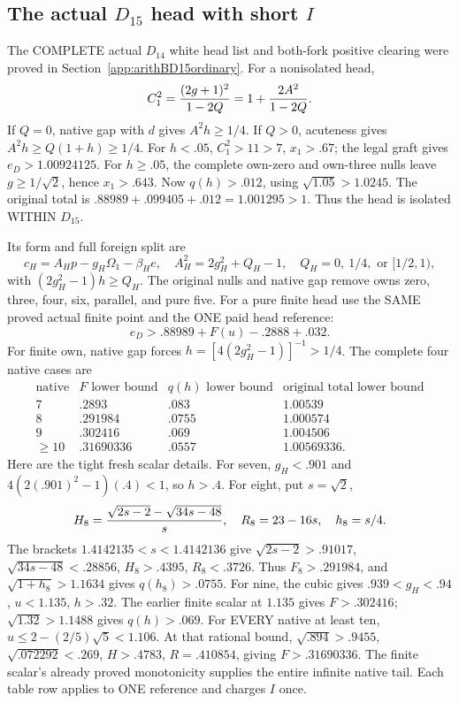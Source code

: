 \subsection{The actual \(D_{15}\) head with short \(I\)}
\label{app:arithD15Ihead}

The COMPLETE actual \(D_{14}\) white head list and
both-fork positive clearing were proved in
Section~\ref{app:arithBD15ordinary}.
For a nonisolated head,
\[
 C_1^2={(2g+1)^2\over1-2Q}
       =1+{2A^2\over1-2Q}.
\]
If \(Q=0\), native gap with \(d\) gives \(A^2h\ge1/4\).
If \(Q>0\), acuteness gives
\(A^2h\ge Q(1+h)\ge1/4\).
For \(h<.05\), \(C_1^2>11>7\), \(x_1>.67\);
the legal graft gives \(e_D>1.00924125\).
For \(h\ge.05\), the complete own-zero and own-three
nulls leave \(g\ge1/\sqrt2\), hence \(x_1>.643\).
Now \(q(h)>.012\), using \(\sqrt{1.05}>1.0245\).
The original total is
\(.88989+.099405+.012=1.001295>1\).
Thus the head is isolated WITHIN \(D_{15}\).

Its form and full foreign split are
\[
 c_H=A_Hp-g_H\Omega_1-\beta_He,\quad
 A_H^2=2g_H^2+Q_H-1,\quad
 Q_H=0,\ 1/4,\text{ or }[1/2,1),
\]
with \((2g_H^2-1)h\ge Q_H\).
The original nulls and native gap remove owns zero,
three, four, six, parallel, and pure five.
For a pure finite head use the SAME proved actual
finite point and the ONE paid head reference:
\[
              e_D>.88989+F(u)-.2888+.032 .
\]
For finite own, native gap forces
\(h=[4(2g_H^2-1)]^{-1}>1/4\).
The complete four native cases are
\[
\begin{array}{c|c|c|c}
 \text{native}&F\text{ lower bound}&q(h)\text{ lower bound}
                         &\text{original total lower bound}\\ \hline
7&.2893&.083&1.00539\\
8&.291984&.0755&1.000574\\
9&.302416&.069&1.004506\\
\ge10&.31690336&.0557&1.00569336 .
\end{array}
\]
Here are the tight fresh scalar details.
For seven, \(g_H<.901\) and
\(4(2(.901)^2-1)(.4)<1\), so \(h>.4\).
For eight, put \(s=\sqrt2\),
\[
 H_8={\sqrt{2s-2}-\sqrt{34s-48}\over s},\quad
 R_8=23-16s,\quad h_8=s/4.
\]
The brackets \(1.4142135<s<1.4142136\) give
\(\sqrt{2s-2}>.91017\),
\(\sqrt{34s-48}<.28856\), \(H_8>.4395\),
\(R_8<.3726\).
Thus \(F_8>.291984\), and
\(\sqrt{1+h_8}>1.1634\) gives \(q(h_8)>.0755\).
For nine, the cubic gives \(.939<g_H<.94\),
\(u<1.135\), \(h>.32\).
The earlier finite scalar at \(1.135\) gives
\(F>.302416\); \(\sqrt{1.32}>1.1488\) gives
\(q(h)>.069\).
For EVERY native at least ten,
\(u\le2-(2/5)\sqrt5<1.106\).
At that rational bound,
\(\sqrt{.894}>.9455\), \(\sqrt{.072292}<.269\),
\(H>.4783\), \(R=.410854\),
giving \(F>.31690336\).
The finite scalar's already proved monotonicity supplies
the entire infinite native tail.
Each table row applies to ONE reference and charges \(I\)
once.

